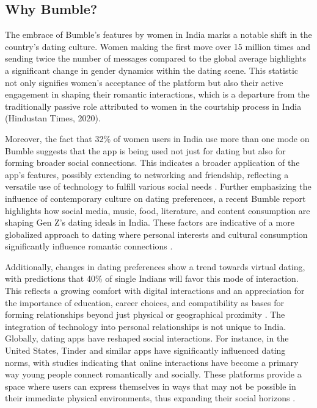 \subsection*{Why Bumble?}
The embrace of Bumble's features by women in India marks a notable shift in the country's dating culture. Women making the first move over 15 million times and sending twice the number of messages compared to the global average highlights a significant change in gender dynamics within the dating scene. This statistic not only signifies women's acceptance of the platform but also their active engagement in shaping their romantic interactions, which is a departure from the traditionally passive role attributed to women in the courtship process in India (Hindustan Times, 2020).

Moreover, the fact that 32\% of women users in India use more than one mode on Bumble suggests that the app is being used not just for dating but also for forming broader social connections. This indicates a broader application of the app's features, possibly extending to networking and friendship, reflecting a versatile use of technology to fulfill various social needs \cite{HindustanTimes_2020}. Further emphasizing the influence of contemporary culture on dating preferences, a recent Bumble report highlights how social media, music, food, literature, and content consumption are shaping Gen Z's dating ideals in India. These factors are indicative of a more globalized approach to dating where personal interests and cultural consumption significantly influence romantic connections \cite{Chronicle_2023}.

Additionally, changes in dating preferences show a trend towards virtual dating, with predictions that 40\% of single Indians will favor this mode of interaction. This reflects a growing comfort with digital interactions and an appreciation for the importance of education, career choices, and compatibility as bases for forming relationships beyond just physical or geographical proximity \cite{MediaInfoline_2021}. The integration of technology into personal relationships is not unique to India. Globally, dating apps have reshaped social interactions. For instance, in the United States, Tinder and similar apps have significantly influenced dating norms, with studies indicating that online interactions have become a primary way young people connect romantically and socially. These platforms provide a space where users can express themselves in ways that may not be possible in their immediate physical environments, thus expanding their social horizons \cite{Smith_2016}.

